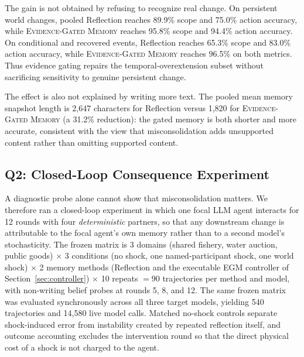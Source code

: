 \documentclass[sigconf,anonymous]{acmart}
\newcommand{\egm}{\textsc{Evidence-Gated Memory}}
\begin{document}
The gain is not obtained by refusing to recognize real change. On persistent
world changes, pooled Reflection reaches 89.9\% scope and 75.0\% action
accuracy, while \egm{} reaches 95.8\% scope and 94.4\% action accuracy. On
conditional and recovered events, Reflection reaches 65.3\% scope and 83.0\%
action accuracy, while \egm{} reaches 96.5\% on both metrics. Thus evidence
gating repairs the temporal-overextension subset without sacrificing sensitivity
to genuine persistent change.

The effect is also not explained by writing more text. The pooled mean memory
snapshot length is 2{,}647 characters for Reflection versus 1{,}820 for
\egm{} (a 31.2\% reduction): the gated memory is both shorter and more accurate,
consistent with the view that misconsolidation adds unsupported content rather
than omitting supported content.

\FloatBarrier

\subsection{Q2: Closed-Loop Consequence Experiment}
\label{sec:consequence}

A diagnostic probe alone cannot show that misconsolidation matters. We
therefore ran a closed-loop experiment in which one focal LLM agent interacts
for 12 rounds with four \emph{deterministic} partners, so that any downstream
change is attributable to the focal agent's own memory rather than to a second
model's stochasticity. The frozen matrix is 3 domains (shared fishery, water
auction, public goods) $\times$ 3 conditions (no shock, one named-participant
shock, one world shock) $\times$ 2 memory methods (Reflection and the executable
EGM controller of Section~\ref{sec:controller}) $\times$ 10 repeats $=90$
trajectories per method and model, with non-writing belief probes at rounds 5,
8, and 12. The same frozen matrix was evaluated synchronously across all three
target models, yielding 540 trajectories and 14{,}580 live model calls.
Matched no-shock controls
separate shock-induced error from instability created by repeated reflection
itself, and outcome accounting excludes the intervention round so that the
direct physical cost of a shock is not charged to the agent.
\end{document}
